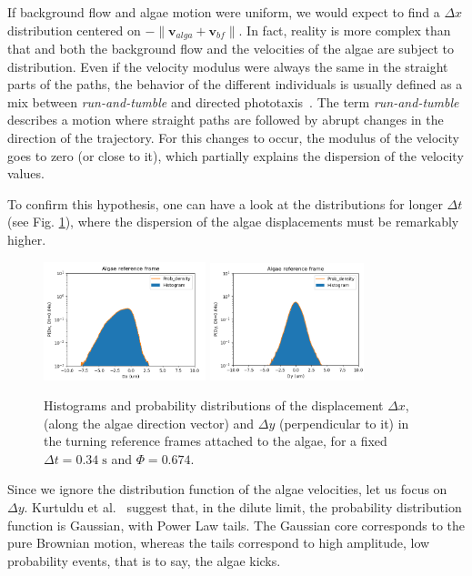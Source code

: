 If background flow and algae motion were uniform, we would expect to find a $\Delta x$ distribution centered on $-\| \mathbf{v}_{alga} + \mathbf{v}_{bf} \|$. In fact, reality is more complex than that and both the background flow and the velocities of the algae are subject to distribution. Even if the velocity modulus were always the same in the straight parts of the paths, the behavior of the different individuals is usually defined as a mix between \textit{run-and-tumble} and directed phototaxis~\cite{Polin}. The term \textit{run-and-tumble} describes a motion where straight paths are followed by abrupt changes in the direction of the trajectory. For this changes to occur, the modulus of the velocity goes to zero (or close to it), which partially explains the dispersion of the velocity values.

To confirm this hypothesis, one can have a look at the distributions for longer $\Delta t$ (see Fig. \ref{prob_dist_e3_longer}), where the dispersion of the algae displacements must be remarkably higher.
 
\begin{figure}[H]
	\centering
	\includegraphics[width=0.42\textwidth]{archivos/pdf_x_e3_longer.png}
	\includegraphics[width=0.4\textwidth]{archivos/pdf_y_e3_longer.png}
	\caption{Histograms and probability distributions of the displacement $\Delta x$, (along the algae direction vector) and $\Delta y$ (perpendicular to it) in the turning reference frames attached to the algae, for a fixed $\Delta t = 0.34 \; \textrm{s}$ and $\Phi = 0.674$.}
	\label{prob_dist_e3_longer}
\end{figure}

Since we ignore the distribution function of the algae velocities, let us focus on $\Delta y$. Kurtuldu et al.~\cite{Kurtuldu2011} suggest that, in the dilute limit, the probability distribution function is Gaussian, with Power Law tails. The Gaussian core corresponds to the pure Brownian motion, whereas the tails correspond to high amplitude, low probability events, that is to say, the algae kicks. 

